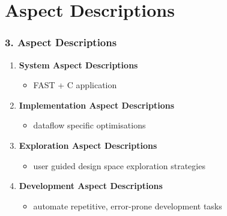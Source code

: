 \section{Aspect Descriptions}
\begin{frame}
  \frametitle{3. Aspect Descriptions}
  \begin{enumerate}
    \setlength{\itemsep}{15pt}
  \item \textbf{System Aspect Descriptions}
    \begin{itemize}
    \item FAST + C application
    \end{itemize}
  \item \textbf{Implementation Aspect Descriptions}
    \begin{itemize}
    \item dataflow specific optimisations
    \end{itemize}
  \item \textbf{Exploration Aspect Descriptions}
    \begin{itemize}
    \item user guided design space exploration strategies
    \end{itemize}
  \item \textbf{Development Aspect Descriptions}
    \begin{itemize}
    \item automate repetitive, error-prone development tasks
    \end{itemize}
  \end{enumerate}
\end{frame}

\begin{comment}
  \begin{frame}
    \frametitle{System Aspect Descriptions}
    Hardware/Software Partitioning:
    \begin{enumerate}
      \setlength{\itemsep}{10pt}
    \item detect hotspots
    \item detect code patterns suitable for acceleration
    \item perform outlining transformation
    \item derive dataflow \texttt{fast\_f()} from \texttt{f()}
    \item place FAST pragma to link \texttt{fast\_f()} with \texttt{f()}
    \end{enumerate}
  \end{frame}
\end{comment}


